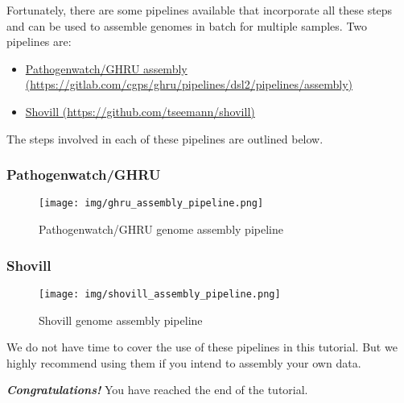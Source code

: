 \documentclass[11pt]{article}
\providecommand{\tightlist}{%
      \setlength{\itemsep}{0pt}\setlength{\parskip}{0pt}}
\begin{document}
    Fortunately, there are some pipelines available that incorporate all
these steps and can be used to assemble genomes in batch for multiple
samples. Two pipelines are:

\begin{itemize}
\tightlist
\item
  \href{https://gitlab.com/cgps/ghru/pipelines/dsl2/pipelines/assembly}{Pathogenwatch/GHRU
  assembly
  (https://gitlab.com/cgps/ghru/pipelines/dsl2/pipelines/assembly)}
\item
  \href{https://github.com/tseemann/shovill}{Shovill
  (https://github.com/tseemann/shovill)}
\end{itemize}

The steps involved in each of these pipelines are outlined below.

    \hypertarget{pathogenwatchghru}{%
\subsubsection{Pathogenwatch/GHRU}\label{pathogenwatchghru}}

    \begin{figure}
\centering
\texttt{[image: img/ghru\_assembly\_pipeline.png]}
\caption{Pathogenwatch/GHRU genome assembly pipeline}
\end{figure}

    \hypertarget{shovill}{%
\subsubsection{Shovill}\label{shovill}}

    \begin{figure}
\centering
\texttt{[image: img/shovill\_assembly\_pipeline.png]}
\caption{Shovill genome assembly pipeline}
\end{figure}

    We do not have time to cover the use of these pipelines in this
tutorial. But we highly recommend using them if you intend to assembly
your own data.

    \textbf{\textit{Congratulations!}} You have reached the end of the
tutorial.


\end{document}
